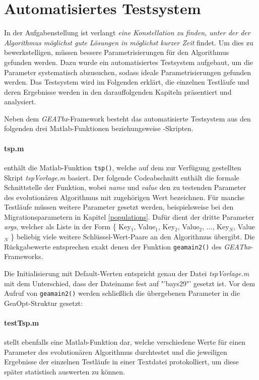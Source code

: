 \section{Automatisiertes Testsystem}\label{testsystem}

In der Aufgabenstellung \citep{aufg} ist verlangt \emph{eine Konstellation zu finden,
unter der der Algorithmus möglichst gute Lösungen in möglichst kurzer Zeit} findet.
Um dies zu bewerkstelligen, müssen bessere Parametrisierungen für den Algorithmus
gefunden werden. Dazu wurde ein automatisiertes Testsystem aufgebaut, um
die Parameter systematisch abzusuchen, sodass ideale Parametrisierungen
gefunden werden. Das Testsystem wird im Folgenden erklärt, die einzelnen Testläufe
und deren Ergebnisse werden in den darauffolgenden Kapiteln präsentiert und
analysiert.

Neben dem \emph{GEATbx}-Framework besteht das automatisierte Testsystem aus den
folgenden drei Matlab-Funktionen beziehungsweise -Skripten.


\paragraph{tsp.m} enthält die Matlab-Funktion {\tt tsp()}, welche auf dem
zur Verfügung gestellten Skript \emph{tspVorlage.m} basiert. Der folgende
Codeabschnitt enthält die formale Schnittstelle der Funktion, wobei \emph{name}
und \emph{value} den zu testenden Parameter des evolutionären Algorithmus mit
zugehörigen Wert bezeichnen.
Für manche Testläufe müssen weitere Parameter gesetzt werden, beispielsweise
bei den Migrationsparametern in Kapitel \ref{populations}. Dafür dient der
dritte Parameter \emph{args}, welcher als Liste in der Form
\{ Key$_{1}$, Value$_{1}$, Key$_{2}$, Value$_{2}$, ..., Key$_{N}$, Value$_{N}$ \}
beliebig viele weitere Schlüssel-Wert-Paare an den Algorithmus übergibt.
Die Rückgabewerte entsprechen exakt denen der Funktion {\tt geamain2()} des
\emph{GEATbx}-Frameworks.



\noindent Die Initialisierung mit Default-Werten entspricht genau der Datei
\emph{tspVorlage.m} mit dem Unterschied, dass der Dateiname fest auf "'bays29"'
gesetzt ist. Vor dem Aufruf von {\tt geamain2()} werden schließlich die
übergebenen Parameter in die GeaOpt-Struktur gesetzt:



\paragraph{testTsp.m} stellt ebenfalls eine Matlab-Funktion dar, welche
verschiedene Werte für einen Parameter des evolutionären Algorithmus durchtestet
und die jeweiligen Ergebnisse der einzelnen Testläufe in einer Textdatei
protokolliert, um diese später statistisch auswerten zu können.

